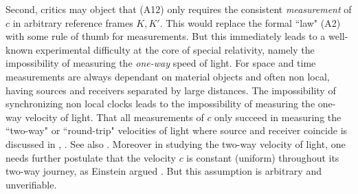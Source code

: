 \documentclass[12pt]{amsart}
\begin{document}

Second, critics may object that (A12) only requires the consistent \emph{measurement} of $c$ in arbitrary reference frames $K, K'$. This would replace the formal ``law" (A2) with some rule of thumb for measurements. But this immediately leads to a well-known experimental difficulty at the core of special relativity, namely the impossibility of measuring the \emph{one-way} speed of light. For space and time measurements are always dependant on material objects and often non local, having sources and receivers separated by large distances. The impossibility of synchronizing non local clocks leads to the impossibility of measuring the one-way velocity of light. That all measurements of $c$ only succeed in measuring the ``two-way" or ``round-trip" velocities of light where source and receiver coincide is discussed in \cite{zhang1997special}, \cite{israel}. See also \cite{vid}. Moreover in studying the two-way velocity of light, one needs further postulate that the velocity $c$ is constant (uniform) throughout its two-way journey, as Einstein argued \cite[Ch.8]{einstein2019relativity}. But this assumption is arbitrary and unverifiable. %
\end{document}
